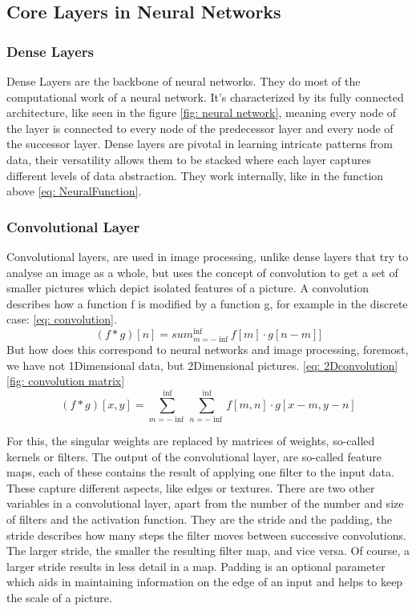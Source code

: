 \subsection{Core Layers in Neural Networks}\label{subsec:core-layers-in-neural-networks}
\subsubsection{Dense Layers}
Dense Layers are the backbone of neural networks.
They do most of the computational work of a neural network.
It's characterized by its fully connected architecture, like seen in the figure \ref{fig: neural network}, meaning every node of the layer is connected to every node of the predecessor layer and every node of the successor layer.
Dense layers are pivotal in learning intricate patterns from data, their versatility allows them to be stacked where each layer captures different levels of data abstraction.
They work internally, like in the function above \ref{eq: NeuralFunction}.
\subsubsection{Convolutional Layer}
Convolutional layers, are used in image processing\cite{lecun_backpropagation_1989,szegedy_going_2014,krizhevsky_imagenet_2012}, unlike dense layers that try to analyse an image as a whole, but uses the concept of convolution to get a set of smaller pictures which depict isolated features of a picture.
A convolution describes how a function f is modified by a function g, for example in the discrete case: \ref{eq: convolution}.
\begin{equation}
(f \ast g)[n] = sum_{m=-\inf}^{\inf}f[m]\cdot g[n - m]
    \label{eq: convolution}]
\end{equation}
But how does this correspond to neural networks and image processing, foremost, we have not 1Dimensional data, but 2Dimensional pictures. \ref{eq: 2Dconvolution} \ref{fig: convolution matrix}
\begin{equation}
(f \ast g)[x,y] = \sum^{\inf}_{m=-\inf} \sum^{\inf}_{n=-\inf} f[m,n]\cdot g[x-m,y-n]
    \label{eq: 2Dconvolution}
\end{equation}

For this, the singular weights are replaced by matrices of weights, so-called kernels or filters.
The output of the convolutional layer, are so-called feature maps, each of these contains the result of applying one filter to the input data.
These capture different aspects, like edges or textures.
There are two other variables in a convolutional layer, apart from the number of the number and size of filters and the activation function.
They are the stride and the padding, the stride describes how many steps the filter moves between successive convolutions.
The larger stride, the smaller the resulting filter map, and vice versa.
Of course, a larger stride results in less detail in a map.
Padding is an optional parameter which aids in maintaining information on the edge of an input and helps to keep the scale of a picture.
